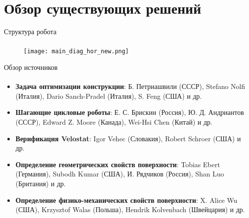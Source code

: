 
\section{Обзор существующих решений}

\begin{frame}[t]{Структура робота}
    \framesubtitle{}
    \begin{figure}[H]
        \centering\texttt{[image: main\_diag\_hor\_new.png]}
    \end{figure}
\end{frame}


\begin{frame}[t]{Обзор источников}
    \framesubtitle{}
    \begin{itemize}
        \item \textbf{Задача оптимизации конструкции}: Б. Петриашвили (СССР), Stefano Nolfi (Италия), Dario Sanch-Pradel (Италия), S. Feng (США) и др.
        \item \textbf{Шагающие цикловые роботы}: Е. С. Брискин (Россия), Ю. Д. Андриантов (СССР), Edward Z. Moore (Канада), Wei-Hsi Chen (Китай) и др.
        \item \textbf{Верификация Velostat}:  Igor Vehec (Словакия),  Robert Schroer (США) и др.
        \item \textbf{Определение геометрических свойств поверхности}: Tobias Ebert (Германия), Subodh Kumar (США), И. Рядчиков (Россия), Shan Luo (Британия) и др.
        \item \textbf{Определение физико-механических свойств поверхности}: X. Alice Wu (США), Krzysztof Walas (Польша), Hendrik Kolvenbach (Швейцария) и др.
    \end{itemize}
\end{frame}

